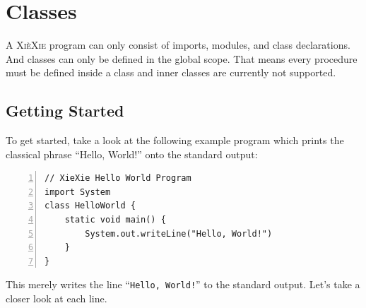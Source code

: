 \documentclass{report}
\def\xiexie{\textsc{Xi\`eXie}\xspace}
\begin{document}

\chapter{Classes}
\label{ch:classes}

A \xiexie program can only consist of imports, modules, and class declarations. And classes can only be defined
in the global scope. That means every procedure must be defined inside a class and inner classes are currently not supported.



\section{Getting Started}

To get started, take a look at the following example program which prints the classical phrase ``Hello, World!''
onto the standard output:
\begin{lstlisting}[numbers=left]
// XieXie Hello World Program
import System
class HelloWorld {
    static void main() {
        System.out.writeLine("Hello, World!")
    }
}
\end{lstlisting}
This merely writes the line ``\texttt{Hello, World!}'' to the standard output. Let's take a closer look at each line.
\end{document}

